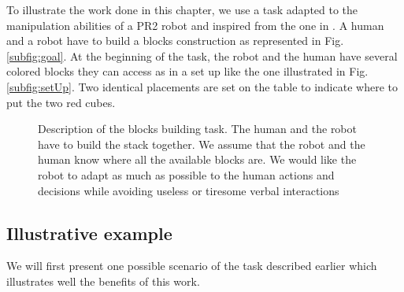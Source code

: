 \documentclass[english,a4paper,11pt,twoside]{StyleThese}
\begin{document}
To illustrate the work done in this chapter, we use a task adapted to the manipulation abilities of a PR2 robot and inspired from the one in \cite{clodic2014key}. A human and a robot have to build a blocks construction as represented in Fig. \ref{subfig:goal}. At the beginning of the task, the robot and the human have several colored blocks they can access as in a set up like the one illustrated in Fig. \ref{subfig:setUp}. Two identical placements are set on the table to indicate where to put the two red cubes.

\begin{figure}[!h]
\centering
	\hfill
    \caption{Description of the blocks building task. The human and the robot have to build the stack together. We assume that the robot and the human know where all the available blocks are. We would like the robot to adapt as much as possible to the human actions and decisions while avoiding useless or tiresome verbal interactions}
    \label{fig:blocksBuildingTask}
\end{figure}

\subsection{Illustrative example}

We will first present one possible scenario of the task described earlier which illustrates well the benefits of this work.
\end{document}
